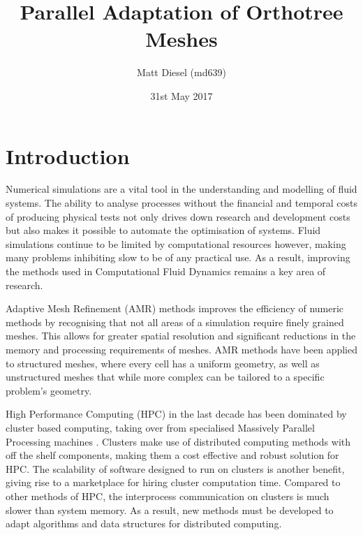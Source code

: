 \documentclass[twoside]{IIBproject}
\numberwithin{figure}{section}
\begin{document}
\date{31st May 2017}
\author{Matt Diesel (md639)}
\title{Parallel Adaptation of Orthotree Meshes}

\pagestyle{empty}
\maketitle

\thispagestyle{empty}
\renewcommand{\abstractname}{Technical Abstract}
\begin{abstract}

\end{abstract}

\newpage
\setcounter{tocdepth}{2}
\tableofcontents
\newpage
\pagestyle{plain}


\section{Introduction} %
    \label{sec:intro}

    Numerical simulations are a vital tool in the understanding and modelling of fluid systems. The ability to analyse processes without the financial and temporal costs of producing physical tests not only drives down research and development costs but also makes it possible to automate the optimisation of systems. Fluid simulations continue to be limited by computational resources however, making many problems inhibiting slow to be of any practical use. As a result, improving the methods used in Computational Fluid Dynamics remains a key area of research.

    Adaptive Mesh Refinement (AMR) methods improves the efficiency of numeric methods by recognising that not all areas of a simulation require finely grained meshes. This allows for greater spatial resolution and significant reductions in the memory and processing requirements of meshes. AMR methods have been applied to structured meshes, where every cell has a uniform geometry, as well as unstructured meshes that while more complex can be tailored to a specific problem's geometry. 

    High Performance Computing (HPC) in the last decade has been dominated by cluster based computing, taking over from specialised Massively Parallel Processing machines \cite{top500}. Clusters make use of distributed computing methods with off the shelf components, making them a cost effective and robust solution for HPC. The scalability of software designed to run on clusters is another benefit, giving rise to a marketplace for hiring cluster computation time. Compared to other methods of HPC, the interprocess communication on clusters is much slower than system memory. As a result, new methods must be developed to adapt algorithms and data structures for distributed computing.
\end{document}
